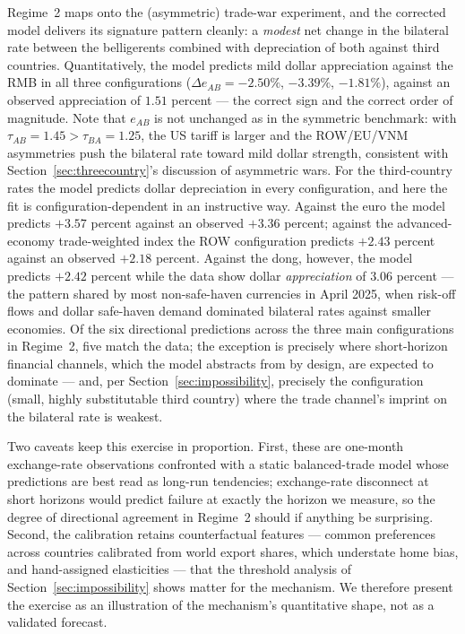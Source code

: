 \documentclass[11pt]{article}
\theoremstyle{plain}
\theoremstyle{remark}
\numberwithin{lemma}{section}
\numberwithin{proposition}{section}
\numberwithin{corollary}{section}
\newenvironment{revblock}{\par\begingroup\color{RevBlue}}{\endgroup\par}
\begin{document}
\begin{revblock}
Regime~2 maps onto the (asymmetric) trade-war experiment, and the corrected model delivers its signature pattern cleanly: a \emph{modest} net change in the bilateral rate between the belligerents combined with depreciation of both against third countries. Quantitatively, the model predicts mild dollar appreciation against the RMB in all three configurations ($\Delta e_{AB} = -2.50\%$, $-3.39\%$, $-1.81\%$), against an observed appreciation of $1.51$ percent --- the correct sign and the correct order of magnitude. Note that $e_{AB}$ is not unchanged as in the symmetric benchmark: with $\tau_{AB} = 1.45 > \tau_{BA} = 1.25$, the US tariff is larger and the ROW/EU/VNM asymmetries push the bilateral rate toward mild dollar strength, consistent with Section~\ref{sec:threecountry}'s discussion of asymmetric wars. For the third-country rates the model predicts dollar depreciation in every configuration, and here the fit is configuration-dependent in an instructive way. Against the euro the model predicts $+3.57$ percent against an observed $+3.36$ percent; against the advanced-economy trade-weighted index the ROW configuration predicts $+2.43$ percent against an observed $+2.18$ percent. Against the dong, however, the model predicts $+2.42$ percent while the data show dollar \emph{appreciation} of $3.06$ percent --- the pattern shared by most non-safe-haven currencies in April 2025, when risk-off flows and dollar safe-haven demand dominated bilateral rates against smaller economies. Of the six directional predictions across the three main configurations in Regime~2, five match the data; the exception is precisely where short-horizon financial channels, which the model abstracts from by design, are expected to dominate --- and, per Section~\ref{sec:impossibility}, precisely the configuration (small, highly substitutable third country) where the trade channel's imprint on the bilateral rate is weakest.

Two caveats keep this exercise in proportion. First, these are one-month exchange-rate observations confronted with a static balanced-trade model whose predictions are best read as long-run tendencies; exchange-rate disconnect at short horizons \citep{itskhoki2021} would predict failure at exactly the horizon we measure, so the degree of directional agreement in Regime~2 should if anything be surprising. Second, the calibration retains counterfactual features --- common preferences across countries calibrated from world export shares, which understate home bias, and hand-assigned elasticities --- that the threshold analysis of Section~\ref{sec:impossibility} shows matter for the mechanism. We therefore present the exercise as an illustration of the mechanism's quantitative shape, not as a validated forecast.
\end{revblock}
\end{document}

